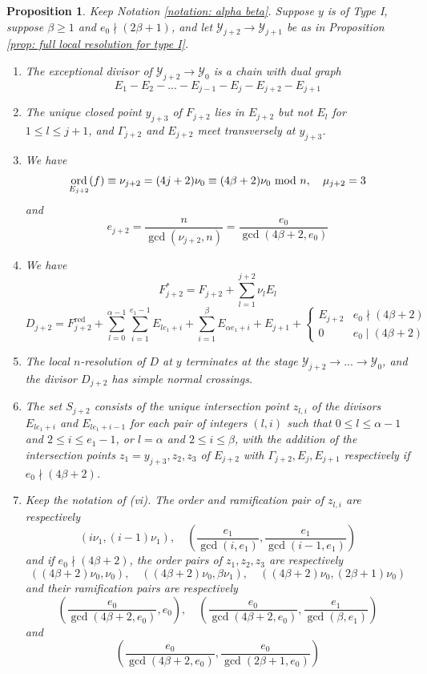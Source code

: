 \documentclass[12pt]{amsart}
\numberwithin{equation}{section}
\newtheorem{prop}[equation]{Proposition}
\theoremstyle{definition}
\newcommand{\Y}{\mathcal{Y}}
\DeclareMathOperator{\red}{red}
\DeclareMathOperator{\ord}{ord}
\begin{document}
\begin{prop}\label{prop: full local resolution for type I continued}
   Keep Notation \ref{notation: alpha beta}. Suppose $y$ is of Type I, suppose $\beta\geq 1$ and $e_0\nmid(2\beta+1)$, and let $\Y_{j+2}\to\Y_{j+1}$ be as in Proposition \ref{prop: full local resolution for type I}.
    \begin{enumerate}[\upshape (i)]
        \item The exceptional divisor of $\Y_{j+2}\to\Y_0$ is a chain with dual graph \[E_1-E_2-...-E_{j-1}-E_j-E_{j+2}-E_{j+1}\]
        \item The unique closed point $y_{j+3}$ of $F_{j+2}$ lies in $E_{j+2}$ but not $E_l$ for $1\leq l\leq j+1$, and $\Gamma_{j+2}$ and $E_{j+2}$ meet transversely at $y_{j+3}$.
        \item We have
        \[\ord_{E_{j+2}}(f)\equiv\nu_{j+2}=(4j+2)\nu_0\equiv(4\beta+2)\nu_0\textup{ mod }n,\quad \mu_{j+2}=3\]
        and
        \[e_{j+2}=\frac{n}{\gcd(\nu_{j+2},n)}=\frac{e_0}{\gcd(4\beta+2,e_0)}\]
        \item We have \[F_{j+2}^*=F_{j+2}+\sum_{l=1}^{j+2} \nu_l E_l\]
        \[D_{j+2}=F_{j+2}^{\red}+\sum_{l=0}^{\alpha-1}\sum_{i=1}^{e_1-1} E_{le_1+i}+\sum_{i=1}^\beta E_{\alpha e_1+i}+E_{j+1}+\begin{cases}
           E_{j+2} &e_0\nmid(4\beta+2)\\
           0 &e_0\mid(4\beta+2)
        \end{cases}\]
        \item The local $n$-resolution of $D$ at $y$ terminates at the stage $\Y_{j+2}\to...\to\Y_0$, and the divisor $D_{j+2}$ has simple normal crossings.
        \item The set $S_{j+2}$ consists of the unique intersection point $z_{l,i}$ of the divisors $E_{le_1+i}$ and $E_{le_1+i-1}$ for each pair of integers $(l,i)$ such that $0\leq l\leq\alpha-1$ and $2\leq i\leq e_1-1$, or $l=\alpha$ and $2\leq i\leq \beta$, with the addition of the intersection points $z_1=y_{j+3},z_2,z_3$ of $E_{j+2}$ with $\Gamma_{j+2},E_j,E_{j+1}$ respectively if $e_0\nmid(4\beta+2)$.
        \item Keep the notation of \textup{(vi)}.
        The order and ramification pair of $z_{l,i}$ are respectively 
        \[(i\nu_1,(i-1)\nu_1),\quad (\frac{e_1}{\gcd(i,e_1)},\frac{e_1}{\gcd(i-1,e_1)})\] and if $e_0\nmid(4\beta+2)$, the order pairs of $z_1,z_2,z_3$ are respectively \[((4\beta+2)\nu_0,\nu_0),\quad((4\beta+2)\nu_0,\beta\nu_1),\quad((4\beta+2)\nu_0,(2\beta+1)\nu_0)\]
        and their ramification pairs are respectively \[(\frac{e_0}{\gcd(4\beta+2,e_0)},e_0),\quad(\frac{e_0}{\gcd(4\beta+2,e_0)},\frac{e_1}{\gcd(\beta,e_1)})\] and \[(\frac{e_0}{\gcd(4\beta+2,e_0)},\frac{e_0}{\gcd(2\beta+1,e_0)})\]
    \end{enumerate}
\end{prop}
\end{document}
